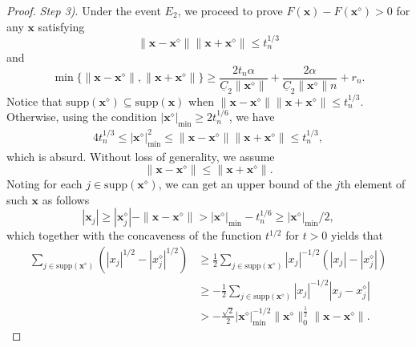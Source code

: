 \documentclass{article}
\numberwithin{equation}{section}
\begin{document}
\begin{proof}
	
	
	
	
	\textit{Step 3)}. Under the event $E_2$, we proceed to prove $F(\mathbf{x})-F(\mathbf{x}^\diamond)>0$ for any $\mathbf{x}$ satisfying $$\|\mathbf{x}-\mathbf{x}^\diamond\|\|\mathbf{x}+\mathbf{x}^\diamond\|\leq  t_n^{1/3}$$
	and 
	\begin{equation}\label{nonasyp-ub}
		\min\{\|\mathbf{x}-\mathbf{x}^\diamond\|, \|\mathbf{x}+\mathbf{x}^\diamond\|\}\geq\frac{2t_n\alpha}{\underline{C}_2\|\mathbf{x}^\diamond\|}+\frac{2\alpha}{\underline{C}_2\|\mathbf{x}^\diamond\|n}
	+r_n.
\end{equation}
Notice that $\mathrm{supp}(\mathbf{x}^\diamond)\subseteq\mathrm{supp}(\mathbf{x})$ when $\|\mathbf{x}-\mathbf{x}^\diamond\|\|\mathbf{x}+\mathbf{x}^\diamond\|\leq  t_n^{1/3}$. Otherwise, using the condition $|\mathbf{x}^\diamond|_{\mathrm{min}}\geq2t_n^{1/6}$, we have
\begin{equation}%
	\begin{aligned}
	4t_n^{1/3}\leq|\mathbf{x}^\diamond|_{\mathrm{min}}^2\leq\|\mathbf{x}-\mathbf{x}^\diamond\|\|\mathbf{x}+\mathbf{x}^\diamond\|\leq  t_n^{1/3},
	\end{aligned}\nonumber
\end{equation}
which is absurd.
	Without loss of generality, we assume $$\|\mathbf{x}-\mathbf{x}^\diamond\|\leq\|\mathbf{x}+\mathbf{x}^\diamond\|.$$
	Noting for each $j\in\mathrm{supp}(\mathbf{x}^\diamond)$, we can get an upper bound of the $j$th element of such $\mathbf{x}$ as follows
	$$|\mathbf{x}_j|\geq|\mathbf{x}_j^\diamond|-\|\mathbf{x}-\mathbf{x}^\diamond\|>|\mathbf{x}^\diamond|_{\mathrm{min}}-t_n^{1/6}
	\geq|\mathbf{x}^\diamond|_{\mathrm{min}}/2,$$
	which together with the concaveness of the function $t^{1/2}$ for $t>0$ yields that
	\begin{equation}%
		\begin{aligned}
			\sum_{j\in\mathrm{supp}(\mathbf{x}^\diamond)}(|x_j|^{1/2}-|x_j^\diamond|^{1/2})
			&\geq\frac{1}{2}\sum_{j\in\mathrm{supp}(\mathbf{x}^\diamond)}|x_j|^{-1/2}(|x_j|-|x_j^\diamond|)\\
			&\geq-\frac{1}{2}\sum_{j\in\mathrm{supp}(\mathbf{x}^\diamond)}|x_j|^{-1/2}|x_j-x_j^\diamond|\\
			&>-\frac{\sqrt{2}}{2}|\mathbf{x}^\diamond|_{\mathrm{min}}^{-1/2}\|\mathbf{x}^\diamond\|_0^{\frac{1}{2}}\|\mathbf{x}-\mathbf{x}^\diamond\|.
		\end{aligned}\nonumber
	\end{equation}
	

\end{proof}
\end{document}
